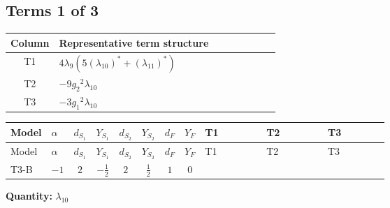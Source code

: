 \documentclass[8pt]{article}
\begin{document}
\begin{landscape}
\subsection*{Terms 1 of 3}
\begin{center}
\begin{tabular}{@{}c >{\raggedright\arraybackslash}p{0.82\linewidth}@{}}
\toprule
Column & Representative term structure \\
\midrule
T1 & \(\displaystyle 4 {\lambda_{9}} (5 \left({\lambda_{10}}\right)^{*}+\left({\lambda_{11}}\right)^{*})\) \\
\midrule
T2 & \(\displaystyle -9 {g_2}^2 {\lambda_{10}}\) \\
\midrule
T3 & \(\displaystyle -3 {g_1}^2 {\lambda_{10}}\) \\
\midrule
\bottomrule
\end{tabular}
\end{center}
\smallskip
\tiny
\begin{longtable}{@{}llcccccc >{\raggedright\arraybackslash}p{0.21\linewidth} >{\raggedright\arraybackslash}p{0.21\linewidth} >{\raggedright\arraybackslash}p{0.21\linewidth}@{}}
\toprule
Model & $\alpha$ & $d_{S_1}$ & $Y_{S_1}$ & $d_{S_2}$ & $Y_{S_2}$ & $d_F$ & $Y_F$ & T1 & T2 & T3 \\
\midrule
\endfirsthead
\toprule
Model & $\alpha$ & $d_{S_1}$ & $Y_{S_1}$ & $d_{S_2}$ & $Y_{S_2}$ & $d_F$ & $Y_F$ & T1 & T2 & T3 \\
\midrule
\endhead
T3-B & $-1$ & $2$ & $-\frac{1}{2}$ & $2$ & $\frac{1}{2}$ & $1$ & $0$ & \scriptsize\adjustbox{max width=\linewidth}{$\begin{gathered} 4 {\lambda_{9}} (5 \left({\lambda_{10}}\right)^{*}+\left({\lambda_{11}}\right)^{*})\end{gathered}$} & \scriptsize\adjustbox{max width=\linewidth}{$\begin{gathered} -9 {g_2}^2 {\lambda_{10}}\end{gathered}$} & \scriptsize\adjustbox{max width=\linewidth}{$\begin{gathered} -3 {g_1}^2 {\lambda_{10}}\end{gathered}$} \\
\midrule
\bottomrule
\end{longtable}
\clearpage
\noindent\textbf{Quantity: }$\lambda_{10}$\par\smallskip

\end{landscape}
\end{document}
